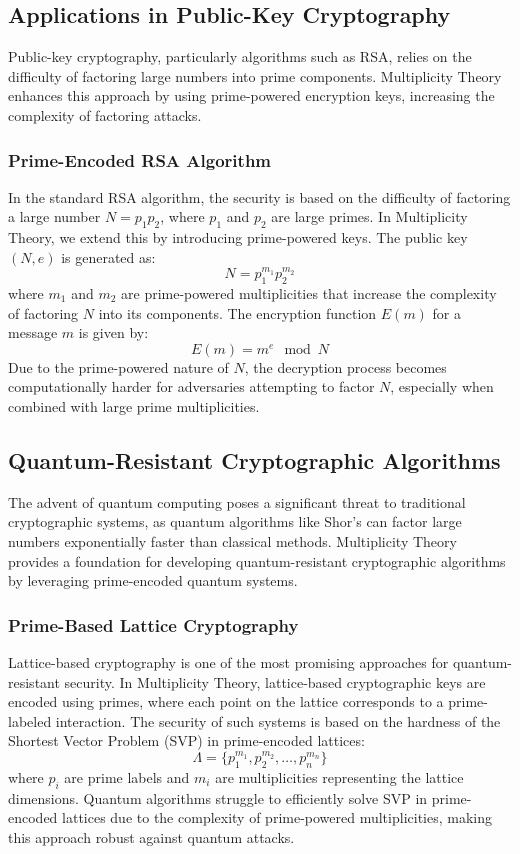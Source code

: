 \documentclass[%
 preprint, linenumbers,
 amsmath,amssymb,
 aps, physrev,
]{revtex4-2}
\begin{document}
\subsection{Applications in Public-Key Cryptography}
Public-key cryptography, particularly algorithms such as RSA, relies on the difficulty of factoring large numbers into prime components. Multiplicity Theory enhances this approach by using prime-powered encryption keys, increasing the complexity of factoring attacks.

\subsubsection{Prime-Encoded RSA Algorithm}
In the standard RSA algorithm, the security is based on the difficulty of factoring a large number \( N = p_1 p_2 \), where \( p_1 \) and \( p_2 \) are large primes. In Multiplicity Theory, we extend this by introducing prime-powered keys. The public key \( (N, e) \) is generated as:
\[
N = p_1^{m_1} p_2^{m_2}
\]
where \( m_1 \) and \( m_2 \) are prime-powered multiplicities that increase the complexity of factoring \( N \) into its components. The encryption function \( E(m) \) for a message \( m \) is given by:
\[
E(m) = m^e \mod N
\]
Due to the prime-powered nature of \( N \), the decryption process becomes computationally harder for adversaries attempting to factor \( N \), especially when combined with large prime multiplicities.

\subsection{Quantum-Resistant Cryptographic Algorithms}
The advent of quantum computing poses a significant threat to traditional cryptographic systems, as quantum algorithms like Shor’s can factor large numbers exponentially faster than classical methods. Multiplicity Theory provides a foundation for developing quantum-resistant cryptographic algorithms by leveraging prime-encoded quantum systems.

\subsubsection{Prime-Based Lattice Cryptography}
Lattice-based cryptography is one of the most promising approaches for quantum-resistant security. In Multiplicity Theory, lattice-based cryptographic keys are encoded using primes, where each point on the lattice corresponds to a prime-labeled interaction. The security of such systems is based on the hardness of the Shortest Vector Problem (SVP) in prime-encoded lattices:
\[
\Lambda = \{p_1^{m_1}, p_2^{m_2}, \dots, p_n^{m_n}\}
\]
where \( p_i \) are prime labels and \( m_i \) are multiplicities representing the lattice dimensions. Quantum algorithms struggle to efficiently solve SVP in prime-encoded lattices due to the complexity of prime-powered multiplicities, making this approach robust against quantum attacks.
\end{document}
